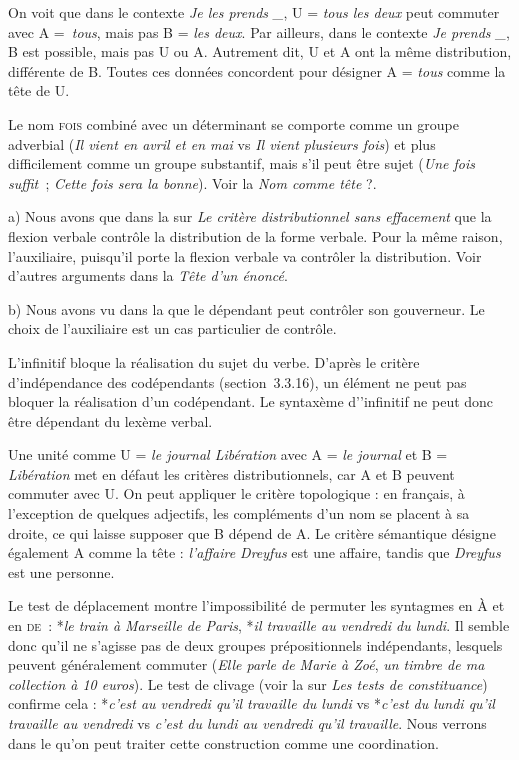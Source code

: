 {     On voit que dans le contexte \textit{Je les prends \-\_}, U = \textit{tous les deux} peut commuter avec A =~\textit{tous}, mais pas B = \textit{les deux}. Par ailleurs, dans le contexte \textit{Je prends \-\_}, B est possible, mais pas U ou A. Autrement dit, U et A ont la même distribution, différente de B. Toutes ces données concordent pour désigner A = \textit{tous} comme la tête de U.

     Le nom \textsc{fois} combiné avec un déterminant se comporte comme un groupe adverbial (\textit{Il vient en avril et en mai} vs \textit{Il vient plusieurs fois}) et plus difficilement comme un groupe substantif, mais s’il peut être sujet (\textit{Une fois suffit~}; \textit{Cette fois sera la bonne}). Voir la  \textit{Nom comme tête} ?.

     a) Nous avons que dans la  sur \textit{Le critère distributionnel sans effacement} que la flexion verbale contrôle la distribution de la forme verbale. Pour la même raison, l’auxiliaire, puisqu’il porte la flexion verbale va contrôler la distribution. Voir d’autres arguments dans la  \textit{Tête d’un énoncé}.

    b) Nous avons vu dans la  que le dépendant peut contrôler son gouverneur. Le choix de l’auxiliaire est un cas particulier de contrôle.

     L’infinitif bloque la réalisation du sujet du verbe. D’après le critère d’indépendance des codépendants (section~3.3.16), un élément ne peut pas bloquer la réalisation d’un codépendant. Le syntaxème d’’infinitif ne peut donc être dépendant du lexème verbal.

     Une unité comme U = \textit{le journal Libération} avec A = \textit{le journal} et B = \textit{Libération} met en défaut les critères distributionnels, car A et B peuvent commuter avec U. On peut appliquer le critère topologique : en français, à l’exception de quelques adjectifs, les compléments d’un nom se placent à sa droite, ce qui laisse supposer que B dépend de A. Le critère sémantique désigne également A comme la tête : \textit{l’affaire Dreyfus} est une affaire, tandis que \textit{Dreyfus} est une personne.

     Le test de déplacement montre l’impossibilité de permuter les syntagmes en À et en \textsc{de~}: *\textit{le train à Marseille de Paris}, *\textit{il travaille au vendredi du lundi}. Il semble donc qu’il ne s’agisse pas de deux groupes prépositionnels indépendants, lesquels peuvent généralement commuter (\textit{Elle parle de Marie à Zoé}, \textit{un timbre de ma collection à 10 euros}). Le test de clivage (voir la  sur \textit{Les tests de constituance}) confirme cela : *\textit{c’est au vendredi qu’il travaille du lundi} vs *\textit{c’est du lundi qu’il travaille au vendredi} vs \textit{c’est du lundi au vendredi qu’il travaille}. Nous verrons dans le  qu’on peut traiter cette construction comme une coordination.

}
